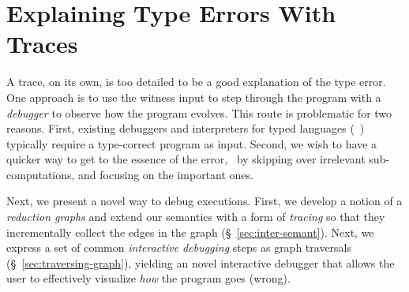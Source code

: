 \section{Explaining Type Errors With Traces}
\label{sec:interactive}

A trace, on its own, is too detailed to be
a good explanation of the type error. One approach
is to use the witness input to step through the
program with a \emph{debugger} to observe how
the program evolves.
%
This route is problematic for two reasons.
%
First, existing debuggers and interpreters for
typed languages (\eg\ \ocaml) typically require
a type-correct program as input.
%
Second, we wish to have a quicker way to get
to the essence of the error, \eg\ by skipping
over irrelevant sub-computations, and focusing
on the important ones.

Next, we present a novel way to debug executions.
%
First, we develop a notion of a \emph{reduction graphs}
and extend our semantics with a form of \emph{tracing}
so that they incrementally collect the edges
in the graph (\S~\ref{sec:inter-semant}).
%
Next, we express a set of common \emph{interactive debugging}
steps as graph traversals (\S~\ref{sec:traversing-graph}), yielding
an novel interactive debugger that allows the user
to effectively visualize \emph{how} the program goes (wrong).

